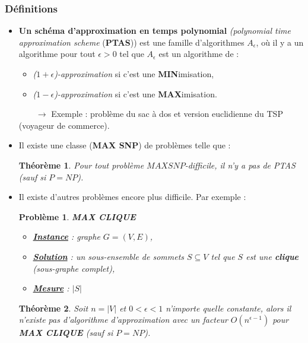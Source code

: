 \documentclass[12pt]{article}
\newtheorem{thm}{Th\'eor\`eme}[section]
\newtheorem{pbm}{Problème}[section]
\begin{document}
\subsubsection{Définitions}

\begin{itemize}
\item \textbf{Un schéma d'approximation en temps polynomial} \textit{(polynomial
time approximation scheme} (\textbf{PTAS})) est une famille d'algorithmes
$A_\epsilon$, où il y a un algorithme pour tout $\epsilon > 0$ tel que
$A_\epsilon$ est un algorithme de :
\begin{itemize}
\item[*] \textit{($1+\epsilon$)-approximation} si c'est une
\textbf{MIN}imisation,
\item[*] \textit{($1-\epsilon$)-approximation} si c'est une
\textbf{MAX}imisation.
\end{itemize}
$\qquad \rightarrow$ Exemple : problème du sac à dos et version euclidienne du
TSP (voyageur de commerce).

\item Il existe une classe (\textbf{MAX SNP}) de problèmes telle que :
\begin{thm} Pour tout problème \textit{$MAX SNP$-difficile}, il n'y a pas de
PTAS (sauf si $P = NP$).
\end{thm}

\item Il existe d'autres problèmes encore plus difficile. Par exemple :\\
\indent \hbox{}
\begin{pbm} \textbf{MAX CLIQUE}
\begin{itemize}
\item[*]\textbf{\underline{Instance}} : graphe $G=(V,E)$,
\item[*]\textbf{\underline{Solution}} : un sous-ensemble de sommets $S
\subseteq V$ tel que $S$ est une \textbf{clique} \textit{(sous-graphe complet)},
\item[*]\textbf{\underline{Mesure}} : $|S|$
\end{itemize}
\indent \hbox{}
\end{pbm}

\begin{thm}Soit $n = |V|$ et $0 < \epsilon < 1$ n'importe quelle constante,
alors il n'existe pas d'algorithme d'approximation avec un facteur
$O(n^{\epsilon-1})$ pour \textbf{MAX CLIQUE} \textit{(sauf si $P = NP$)}.
\end{thm}


\end{itemize}
\end{document}
